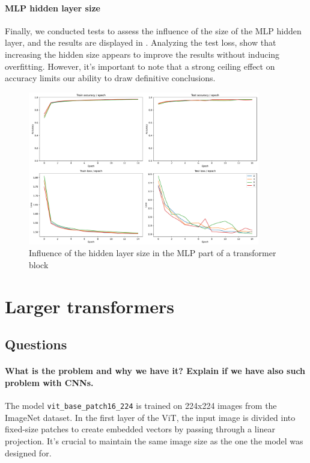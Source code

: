 \paragraph{MLP hidden layer size}
Finally, we conducted tests to assess the influence of the size of the MLP hidden layer, and the results are displayed in . Analyzing the test loss, show that increasing the hidden size appears to improve the results without inducing overfitting. However, it's important to note that a strong ceiling effect on accuracy limits our ability to draw definitive conclusions.

\begin{figure}[H]
    \centering
    \includegraphics*[width=0.9\textwidth]{figs/Transformers/mlp_ratio_influence.pdf}
    \caption{Influence of the hidden layer size in the MLP part of a transformer block}
    \label{fig:mlp_ratio_influence}
\end{figure}

\section{Larger transformers}
\subsection{Questions}
\paragraph{What is the problem and why we have it? Explain if we have also such problem with CNNs.}
The model \texttt{vit\_base\_patch16\_224} is trained on 224x224 images from the ImageNet dataset. In the first layer of the ViT, the input image is divided into fixed-size patches to create embedded vectors by passing through a linear projection. It's crucial to maintain the same image size as the one the model was designed for.

